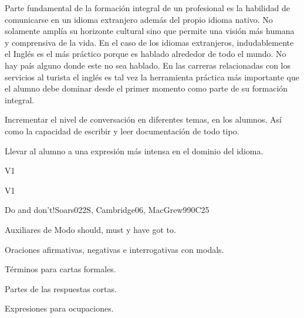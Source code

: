 \begin{syllabus}


\begin{justification}
Parte fundamental de la formación integral de un profesional es la habilidad de comunicarse en un idioma extranjero además del propio idioma nativo. No solamente amplía su horizonte cultural sino que permite una visión más humana y comprensiva de la vida. En el caso de los idiomas extranjeros, indudablemente el Inglés es el 
más práctico porque es hablado alrededor de todo el mundo. No hay país alguno donde este no sea hablado. En las carreras relacionadas con los servicios al turista el inglés es tal vez la herramienta práctica más importante que el alumno debe dominar desde el primer momento como parte de su formación integral.
\end{justification}

\begin{goals}
\item Incrementar el nivel de conversación en diferentes temas, en los alumnos. Así como la capacidad de escribir y leer documentación de todo tipo.
\item Llevar al alumno a una expresión  más intensa en el dominio del idioma.
\end{goals}

\begin{outcomes}{V1}
\item {}
\end{outcomes}

\begin{competences}{V1}
\item {}
\end{competences}

\begin{unit}{Do and don't!}{}{Soars022S, Cambridge06, MacGrew99}{0}{C25}
   \begin{topics}
      \item Auxiliares de Modo should, must y have got to.
      \item Oraciones afirmativas, negativas e interrogativas con modals.
      \item Términos para cartas formales.
      \item Partes de las respuestas cortas.
      \item Expresiones para ocupaciones.
   \end{topics}


\end{unit}
\end{syllabus}
